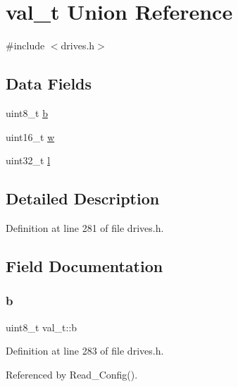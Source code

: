 \hypertarget{unionval__t}{}\section{val\+\_\+t Union Reference}
\label{unionval__t}


{\ttfamily \#include $<$drives.\+h$>$}

\subsection*{Data Fields}
\begin{DoxyCompactItemize}
\item 
uint8\+\_\+t \hyperlink{unionval__t_aa1beb825450163cb6c0f3bfeea7a8098}{b}
\item 
uint16\+\_\+t \hyperlink{unionval__t_a35ceb0f111824a2835370671131c38c0}{w}
\item 
uint32\+\_\+t \hyperlink{unionval__t_a9104daa7fde3f83545528fa75871bc84}{l}
\end{DoxyCompactItemize}


\subsection{Detailed Description}


Definition at line 281 of file drives.\+h.



\subsection{Field Documentation}
\mbox{\label{unionval__t_aa1beb825450163cb6c0f3bfeea7a8098}} 
\subsubsection{\texorpdfstring{b}{b}}
{\footnotesize\ttfamily uint8\+\_\+t val\+\_\+t\+::b}



Definition at line 283 of file drives.\+h.



Referenced by Read\+\_\+\+Config().

\mbox{\label{unionval__t_a9104daa7fde3f83545528fa75871bc84}} 
